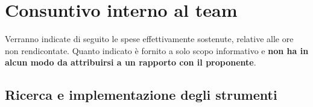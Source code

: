 %


\section{Consuntivo interno al team} %
\label{sec:consuntivo_interno_al_team}
Verranno indicate di seguito le spese effettivamente sostenute, relative alle ore non rendicontate. Quanto indicato è fornito a solo scopo informativo e \textbf{non ha in alcun modo da attribuirsi a un rapporto con il proponente}.

	\subsection{Ricerca e implementazione degli strumenti} %
	\label{sub:ricerca_e_implementazione_degli_strumenti}

